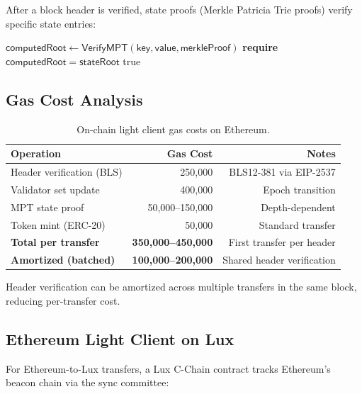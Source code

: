 After a block header is verified, state proofs (Merkle Patricia Trie proofs) verify specific state entries:

\begin{algorithm}[H]
\caption{State Proof Verification on Ethereum}
\label{alg:state_proof}
\begin{algorithmic}[1]
    \State $\mathsf{computedRoot} \gets \mathsf{VerifyMPT}(\mathsf{key}, \mathsf{value}, \mathsf{merkleProof})$
    \State \textbf{require} $\mathsf{computedRoot} = \mathsf{stateRoot}$
    \State \Return true
\EndProcedure
\end{algorithmic}
\end{algorithm}

\subsection{Gas Cost Analysis}

\begin{table}[H]
\centering
\caption{On-chain light client gas costs on Ethereum.}
\label{tab:lc_gas}
\begin{tabular}{lrr}
\toprule
\textbf{Operation} & \textbf{Gas Cost} & \textbf{Notes} \\
\midrule
Header verification (BLS) & 250,000 & BLS12-381 via EIP-2537 \\
Validator set update & 400,000 & Epoch transition \\
MPT state proof & 50,000--150,000 & Depth-dependent \\
Token mint (ERC-20) & 50,000 & Standard transfer \\
\midrule
\textbf{Total per transfer} & \textbf{350,000--450,000} & First transfer per header \\
\textbf{Amortized (batched)} & \textbf{100,000--200,000} & Shared header verification \\
\bottomrule
\end{tabular}
\end{table}

Header verification can be amortized across multiple transfers in the same block, reducing per-transfer cost.

\subsection{Ethereum Light Client on Lux}

For Ethereum-to-Lux transfers, a Lux C-Chain contract tracks Ethereum's beacon chain via the sync committee:

